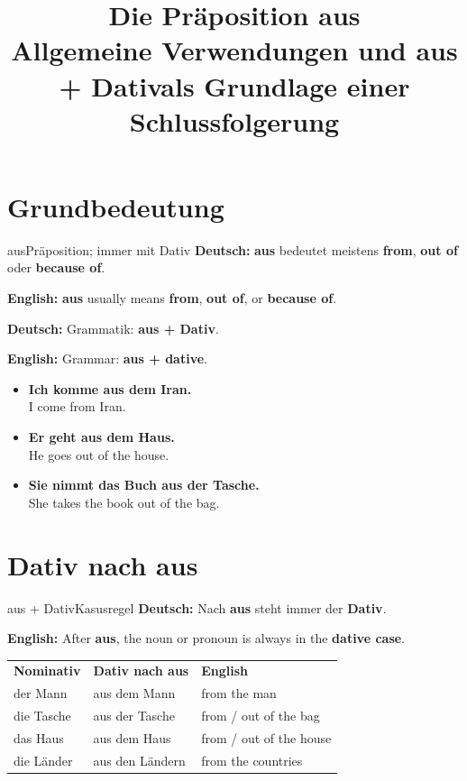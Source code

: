 \documentclass[a4paper,11pt]{article}
\title{Die Präposition \glqq aus\grqq\\Allgemeine Verwendungen und \glqq aus + Dativ\grqq als Grundlage einer Schlussfolgerung}
\date{}
\newcommand{\GermanText}[1]{\textbf{Deutsch: }#1\par}
\newcommand{\EnglishText}[1]{{\small\color{SoftGray}\textbf{English: }#1\par}}
\newcommand{\ExampleItem}[2]{\item \textbf{#1}\\{\small\color{SoftGray}#2}}
\begin{document}
\maketitle
\tableofcontents
\newpage

\section{Grundbedeutung}

\begin{grammarentry}{aus}{Präposition; immer mit Dativ}
\GermanText{\textbf{aus} bedeutet meistens \textbf{from}, \textbf{out of} oder \textbf{because of}.}
\EnglishText{\textbf{aus} usually means \textbf{from}, \textbf{out of}, or \textbf{because of}.}

\GermanText{Grammatik: \textbf{aus + Dativ}.}
\EnglishText{Grammar: \textbf{aus + dative}.}
\end{grammarentry}

\begin{exbox}
\begin{itemize}
\ExampleItem{Ich komme aus dem Iran.}{I come from Iran.}
\ExampleItem{Er geht aus dem Haus.}{He goes out of the house.}
\ExampleItem{Sie nimmt das Buch aus der Tasche.}{She takes the book out of the bag.}
\end{itemize}
\end{exbox}

\section{Dativ nach \glqq aus\grqq}

\begin{grammarentry}{aus + Dativ}{Kasusregel}
\GermanText{Nach \textbf{aus} steht immer der \textbf{Dativ}.}
\EnglishText{After \textbf{aus}, the noun or pronoun is always in the \textbf{dative case}.}
\end{grammarentry}

\begin{longtable}{p{4cm}|p{5cm}|p{5cm}}
\rowcolor{HeaderBlueDark}
\color{white}\textbf{Nominativ} &
\color{white}\textbf{Dativ nach aus} &
\color{white}\textbf{English} \\
der Mann & aus dem Mann & from the man \\
die Tasche & aus der Tasche & from / out of the bag \\
das Haus & aus dem Haus & from / out of the house \\
die Länder & aus den Ländern & from the countries \\
\end{longtable}
\end{document}
